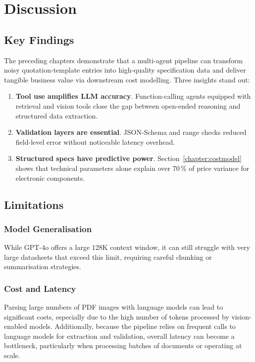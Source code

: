 \chapter{Discussion}
\label{chapter:discussion}

\section{Key Findings}
The preceding chapters demonstrate that a multi-agent pipeline can transform noisy quotation-template entries into high-quality specification data and deliver tangible business value via downstream cost modelling.  Three insights stand out:
\begin{enumerate}
  \item \textbf{Tool use amplifies LLM accuracy}. Function-calling agents equipped with retrieval and vision tools close the gap between open-ended reasoning and structured data extraction.
  \item \textbf{Validation layers are essential}. JSON-Schema and range checks reduced field-level error without noticeable latency overhead.
  \item \textbf{Structured specs have predictive power}. Section~\ref{chapter:costmodel} shows that technical parameters alone explain over 70\,\% of price variance for electronic components.
\end{enumerate}

\section{Limitations}
\subsection{Model Generalisation}
While GPT-4o offers a large 128K context window, it can still struggle with very large datasheets that exceed this limit, requiring careful chunking or summarisation strategies.

\subsection{Cost and Latency}
Parsing large numbers of PDF images with language models can lead to significant costs, especially due to the high number of tokens processed by vision-enabled models. Additionally, because the pipeline relies on frequent calls to language models for extraction and validation, overall latency can become a bottleneck, particularly when processing batches of documents or operating at scale.

